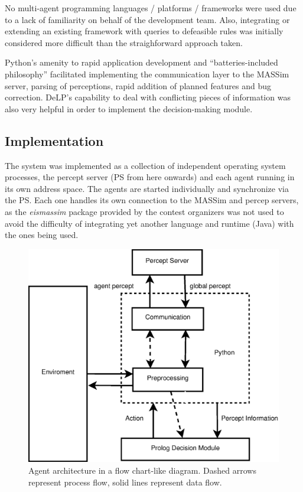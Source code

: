     No multi-agent programming languages / platforms / frameworks were used due to 
    a lack of familiarity on behalf of the development team. 
    Also, integrating or extending an existing framework with queries to
    defeasible rules was initially considered more difficult than the
    straighforward approach taken.

    Python's amenity to rapid application development and ``batteries-included 
    philosophy'' facilitated implementing the communication layer to the MASSim 
    server, parsing of perceptions, rapid addition of planned features and bug 
    correction. DeLP's capability to deal with conflicting pieces of
    information was also very helpful in order to implement the
    decision-making module. 

\subsection{Implementation}
    The system was implemented as a collection of independent operating system
    processes, the percept server (PS from here onwards) and each agent running
    in its own address space.  The agents are started individually and
    synchronize via the PS.  Each one handles its own connection to
    the MASSim and percep servers, as the \textit{eismassim} package provided
    by the contest organizers was not used to avoid the difficulty of
    integrating yet another language and runtime (Java) with the ones being
    used. 
    
    \begin{figure}
    \centering
    \includegraphics[scale=.3]{agentarchitecture.eps}
    \caption{Agent architecture in a flow chart-like diagram. Dashed arrows
    represent process flow, solid lines represent data flow.}
    \label{fig:architecture}
    \end{figure}

